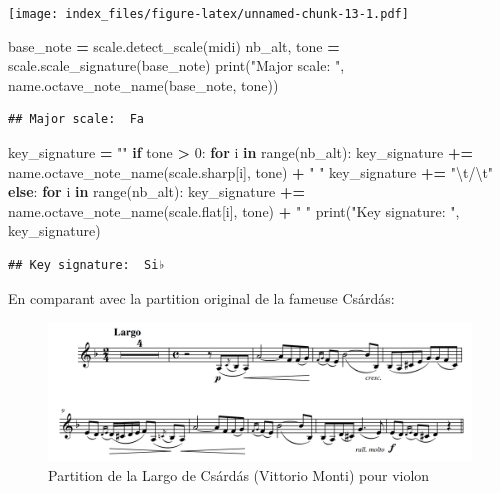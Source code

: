 \documentclass[]{article}
\newenvironment{Shaded}{\begin{snugshade}}{\end{snugshade}}
\newcommand{\BuiltInTok}[1]{#1}
\newcommand{\CharTok}[1]{\textcolor[rgb]{0.31,0.60,0.02}{#1}}
\newcommand{\ControlFlowTok}[1]{\textcolor[rgb]{0.13,0.29,0.53}{\textbf{#1}}}
\newcommand{\DecValTok}[1]{\textcolor[rgb]{0.00,0.00,0.81}{#1}}
\newcommand{\KeywordTok}[1]{\textcolor[rgb]{0.13,0.29,0.53}{\textbf{#1}}}
\newcommand{\NormalTok}[1]{#1}
\newcommand{\OperatorTok}[1]{\textcolor[rgb]{0.81,0.36,0.00}{\textbf{#1}}}
\newcommand{\StringTok}[1]{\textcolor[rgb]{0.31,0.60,0.02}{#1}}
\begin{document}
\texttt{[image: index\_files/figure-latex/unnamed-chunk-13-1.pdf]}

\begin{Shaded}
\begin{Highlighting}[]
\NormalTok{base_note }\OperatorTok{=}\NormalTok{ scale.detect_scale(midi)}
\NormalTok{nb_alt, tone }\OperatorTok{=}\NormalTok{ scale.scale_signature(base_note)}
\BuiltInTok{print}\NormalTok{(}\StringTok{"Major scale: "}\NormalTok{, name.octave_note_name(base_note, tone))}
\end{Highlighting}
\end{Shaded}

\begin{verbatim}
## Major scale:  Fa
\end{verbatim}

\begin{Shaded}
\begin{Highlighting}[]
\NormalTok{key_signature }\OperatorTok{=} \StringTok{""}
\ControlFlowTok{if}\NormalTok{ tone }\OperatorTok{>} \DecValTok{0}\NormalTok{:}
    \ControlFlowTok{for}\NormalTok{ i }\KeywordTok{in} \BuiltInTok{range}\NormalTok{(nb_alt):}
\NormalTok{        key_signature }\OperatorTok{+=}\NormalTok{ name.octave_note_name(scale.sharp[i], tone) }\OperatorTok{+} \StringTok{" "}
\NormalTok{    key_signature }\OperatorTok{+=} \StringTok{"}\CharTok{\textbackslash{}t}\StringTok{/}\CharTok{\textbackslash{}t}\StringTok{"}
\ControlFlowTok{else}\NormalTok{:}
    \ControlFlowTok{for}\NormalTok{ i }\KeywordTok{in} \BuiltInTok{range}\NormalTok{(nb_alt):}
\NormalTok{        key_signature }\OperatorTok{+=}\NormalTok{ name.octave_note_name(scale.flat[i], tone) }\OperatorTok{+} \StringTok{" "}
\BuiltInTok{print}\NormalTok{(}\StringTok{"Key signature: "}\NormalTok{, key_signature)}
\end{Highlighting}
\end{Shaded}

\begin{verbatim}
## Key signature:  Si♭
\end{verbatim}

En comparant avec la partition original de la fameuse Csárdás:

\begin{figure}
\centering
\includegraphics{img/czardas_partition.png}
\caption{Partition de la Largo de Csárdás (Vittorio Monti) pour violon}
\end{figure}
\end{document}
